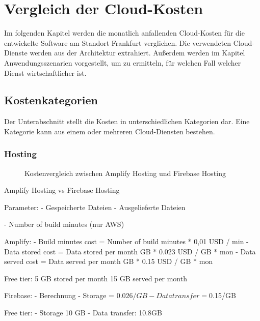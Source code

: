 \chapter{Vergleich der Cloud-Kosten}

Im folgenden Kapitel werden die monatlich anfallenden Cloud-Kosten \autocite{awsPricing} \autocite{gcpPricing} für die entwickelte Software am Standort Frankfurt verglichen. Die verwendeten Cloud-Dienste werden aus der Architektur extrahiert. Außerdem werden im Kapitel Anwendungsszenarien vorgestellt, um zu ermitteln, für welchen Fall welcher Dienst wirtschaftlicher ist.

\section{Kostenkategorien}

Der Unterabschnitt stellt die Kosten in unterschiedlichen Kategorien dar. Eine Kategorie kann aus einem oder mehreren Cloud-Diensten bestehen.

\subsection{Hosting}

\begin{figure}%
    \centering
    \qquad
    \caption{Kostenvergleich zwischen Amplify Hosting und Firebase Hosting}%
    \label{kostenvergleichHosting}%
\end{figure}

Amplify Hosting vs Firebase Hosting

Parameter:
- Gespeicherte Dateien
- Ausgelieferte Dateien

- Number of build minutes (nur AWS)


Amplify:
- Build minutes cost = Number of build minutes * 0,01 USD / min
- Data stored cost = Data stored per month GB * 0.023 USD / GB * mon
- Data served cost = Data served per month GB * 0.15 USD / GB * mon

Free tier:
5 GB stored per month
15 GB served per month

Firebase:
- Berechnung
    - Storage = $0.026/GB
    - Data transfer = $0.15/GB

Free tier:
- Storage 10 GB
- Data transfer: 10.8GB

